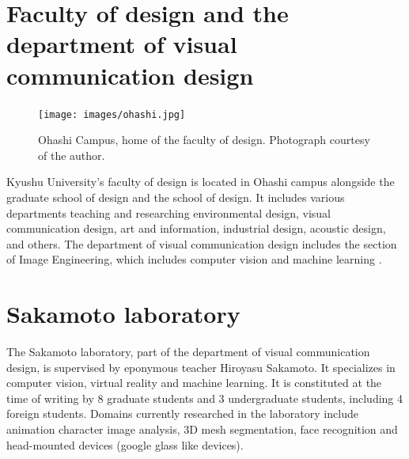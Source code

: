 \section{Faculty of design and the department of visual communication design}
\begin{figure}[htb!]
\texttt{[image: images/ohashi.jpg]}
\caption{Ohashi Campus, home of the faculty of design. Photograph courtesy of the author.}
\label{fig:ohashi}
\end{figure}
Kyushu University's faculty of design is located in Ohashi campus alongside the graduate school of design and the school of design. It includes various departments teaching and researching environmental design, visual communication design, art and information, industrial design, acoustic design, and others. The department of visual communication design includes the section of Image Engineering, which includes computer vision and machine learning \cite{facultyDesignWebsite}.

\section{Sakamoto laboratory}
The Sakamoto laboratory, part of the department of visual communication design, is supervised by eponymous teacher Hiroyasu Sakamoto. It specializes in computer vision, virtual reality and machine learning. It is constituted at the time of writing by 8 graduate students and 3 undergraduate students, including 4 foreign students. Domains currently researched in the laboratory include animation character image analysis, 3D mesh segmentation, face recognition and head-mounted devices (google glass like devices).
